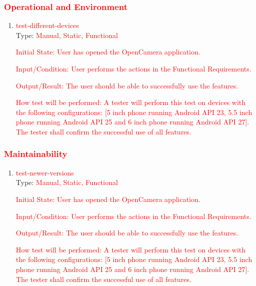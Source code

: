 \documentclass[12pt, titlepage]{article}
\begin{document}
\subsubsection{\textcolor{red}{Operational and Environment}}
\begin{enumerate}

\item{\textcolor{red}{test-different-devices}\\}
Type: \textcolor{red}{Manual, Static, Functional}
					
\textcolor{red}{Initial State: User has opened the OpenCamera application.}
				
\textcolor{red}{Input/Condition: User performs the actions in the Functional Requirements.}
					
\textcolor{red}{Output/Result: The user should be able to successfully use the features.}
					
\textcolor{red}{How test will be performed: A tester will perform this test on devices with the following configurations: [5 inch phone running Android API 23, 5.5 inch phone running Android API 25 and 6 inch phone running Android API 27]. The tester shall confirm the successful use of all features.}

\end{enumerate}

\subsubsection{\textcolor{red}{Maintainability}}
\begin{enumerate}

\item{\textcolor{red}{test-newer-versions}\\}
Type: \textcolor{red}{Manual, Static, Functional}
					
\textcolor{red}{Initial State: User has opened the OpenCamera application.}
				
\textcolor{red}{Input/Condition: User performs the actions in the Functional Requirements.}
					
\textcolor{red}{Output/Result: The user should be able to successfully use the features.}
					
\textcolor{red}{How test will be performed: A tester will perform this test on devices with the following configurations: [5 inch phone running Android API 23, 5.5 inch phone running Android API 25 and 6 inch phone running Android API 27]. The tester shall confirm the successful use of all features.}

\end{enumerate}
\end{document}
